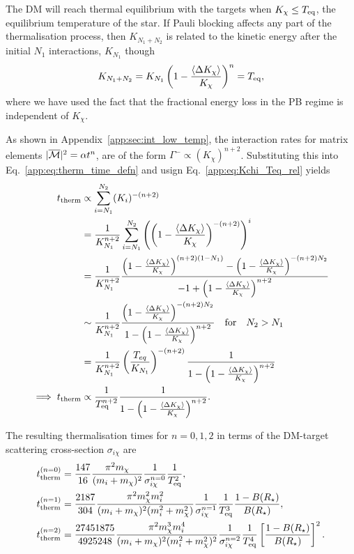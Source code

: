 The DM will reach thermal equilibrium with the targets when $K_\chi \leq T_{\rm eq}$, the equilibrium temperature of the star. 
If Pauli blocking affects any part of the thermalisation process, then $K_{N_1 + N_2}$ is related to the kinetic energy after the initial $N_1$ interactions, $K_{N_1}$ though
\begin{equation}
    K_{N_1 + N_2} = K_{N_1}\left( 1 - \frac{\langle \Delta K_\chi \rangle}{K_{\chi}}\right)^n = T_{\rm eq},
    \label{app:eq:Kchi_Teq_rel}
\end{equation}
where we have used the fact that the fractional energy loss in the PB regime is independent of $K_\chi$.

As shown in Appendix~\ref{app:sec:int_low_temp}, the interaction rates for matrix elements $|\overline{\mathcal M}|^2 = \alpha t^n$, are of the form $\Gamma^-\propto (K_\chi)^{n+2}$. Substituting this into Eq.~\ref{app:eq:therm_time_defn} and usign Eq.~\ref{app:eq:Kchi_Teq_rel} yields
\begin{align}
    t_{\rm therm} & \propto \sum_{i=N_1}^{N_2} (K_{i})^{-(n+2)}\\
    & = \frac{1}{K_{N_1}^{n+2}}\sum_{i=N_1}^{N_2}\left(\left( 1 - \frac{\langle \Delta K_\chi \rangle}{K_{\chi}}\right)^{-(n+2)}\right)^i\\
    & = \frac{1}{K_{N_1}^{n+2}}\frac{\left(1 - \frac{\langle \Delta K_\chi \rangle}{K_{\chi}}\right)^{(n+2)(1-N_1)} - \left(1 -\frac{\langle \Delta K_\chi \rangle}{K_{\chi}}\right)^{-(n+2) N_2}}{-1 + \left(1 - \frac{\langle \Delta K_\chi \rangle}{K_{\chi}}\right)^{n+2}}\\
    & \sim  \frac{1}{K_{N_1}^{n+2}} \frac{\left(1 - \frac{\langle \Delta K_\chi \rangle}{K_{\chi}}\right)^{-(n+2) N_2}}{1 - \left(1 - \frac{\langle \Delta K_\chi \rangle}{K_{\chi}}\right)^{n+2}}\quad \text{for}\quad N_2 > N_1\\
    & =  \frac{1}{K_{N_1}^{n+2}} \left( \frac{T_{eq}}{K_{N_1}}\right)^{-(n+2)}\frac{1}{1 - \left(1 - \frac{\langle \Delta K_\chi \rangle}{K_{\chi}}\right)^{n+2}}\\
  \implies t_{\rm therm}  & \propto \frac{1}{T_{\rm eq}^{n+2}}\frac{1}{1 - \left(1 - \frac{\langle \Delta K_\chi \rangle}{K_{\chi}}\right)^{n+2}}.
\end{align}

The resulting thermalisation times for $n = 0, 1, 2$ in terms of the DM-target scattering cross-section $\sigma_{i\chi}$ are
\begin{align}
    t_{\rm therm}^{(n=0)} & = \frac{147}{16}\frac{\pi^2 m_\chi}{(m_i + m_\chi)^2} \frac{1}{\sigma_{i\chi}^{n=0}} \frac{1}{T_{\rm eq}^2},\\
    t_{\rm therm}^{(n=1)} & = \frac{2187}{304}\frac{\pi^2 m_\chi^2 m_i^2}{(m_i + m_\chi)^2(m_i^2 + m_\chi^2)} \frac{1}{\sigma_{i\chi}^{n=1}} \frac{1}{T_{\rm eq}^3}\frac{1 - B(R_\star)}{B(R_\star)},\\
    t_{\rm therm}^{(n=2)} & = \frac{27451875}{4925248}\frac{\pi^2 m_\chi^3m_i^4}{(m_i + m_\chi)^2(m_i^2 + m_\chi^2)^2} \frac{1}{\sigma_{i\chi}^{n=2}} \frac{1}{T_{\rm eq}^4}\left[\frac{1 - B(R_\star)}{B(R_\star)}\right]^2.
\end{align}




